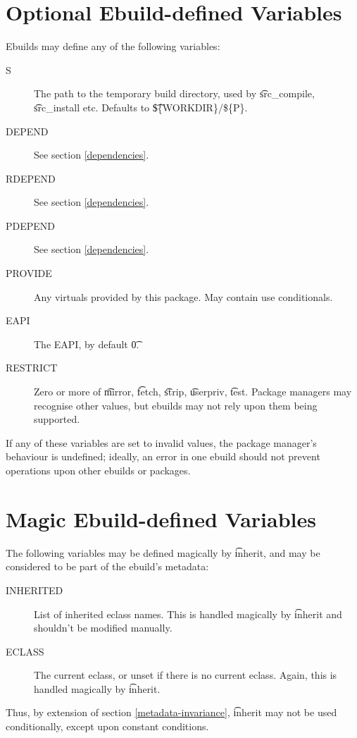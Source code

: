 \section{Optional Ebuild-defined Variables}

Ebuilds may define any of the following variables:

\begin{description}
\item[S] The path to the temporary build directory, used by \t{src\_compile}, \t{src\_install}
    etc. Defaults to \t{\$\{WORKDIR\}/\$\{P\}}.
\item[DEPEND] See section \ref{dependencies}.
\item[RDEPEND] See section \ref{dependencies}.
\item[PDEPEND] See section \ref{dependencies}.
\item[PROVIDE] Any  virtuals provided by this package. May contain use conditionals.
    \label{ebuild-var-provide}
\item[EAPI] The EAPI, by default \t{0}.
\item[RESTRICT] Zero or more of \t{mirror}, \t{fetch}, \t{strip}, \t{userpriv}, \t{test}.
    Package managers may recognise other values, but ebuilds may not rely upon them being
    supported.
\end{description}

If any of these variables are set to invalid values, the package manager's behaviour is undefined;
ideally, an error in one ebuild should not prevent operations upon other ebuilds or packages.

\section{Magic Ebuild-defined Variables}

The following variables may be defined magically by \t{inherit}, and may be considered to be part
of the ebuild's metadata:

\begin{description}
\item[INHERITED] List of inherited eclass names. This is handled magically by \t{inherit} and
    shouldn't be modified manually.
\item[ECLASS] The current eclass, or unset if there is no current eclass. Again, this is handled
    magically by \t{inherit}.
\end{description}

\note Thus, by extension of section \ref{metadata-invariance}, \t{inherit} may not be used
    conditionally, except upon constant conditions.

